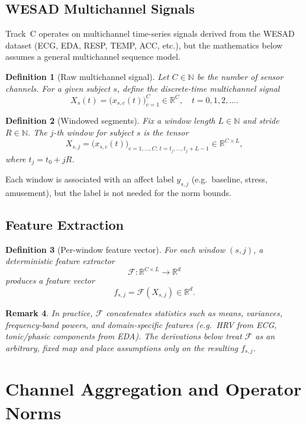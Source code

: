 \documentclass[11pt]{article}
\newtheorem{definition}{Definition}[section]
\newtheorem{remark}[definition]{Remark}
\newcommand{\R}{\mathbb{R}}
\newcommand{\N}{\mathbb{N}}
\begin{document}
\subsection{WESAD Multichannel Signals}

Track~C operates on multichannel time-series signals derived from the WESAD dataset (ECG, EDA, RESP, TEMP, ACC, etc.), but the mathematics below assumes a general multichannel sequence model.

\begin{definition}[Raw multichannel signal]
Let \(C \in \N\) be the number of sensor channels.
For a given subject \(s\), define the discrete-time multichannel signal
\[
  X_s(t) = \bigl(x_{s,c}(t)\bigr)_{c=1}^C \in \R^C, \quad t = 0,1,2,\dots .
\]
\end{definition}

\begin{definition}[Windowed segments]
Fix a window length \(L \in \N\) and stride \(R \in \N\).
The \(j\)-th window for subject \(s\) is the tensor
\[
  X_{s,j} = \bigl(x_{s,c}(t)\bigr)_{c=1,\dots,C;\, t = t_j,\dots,t_j+L-1}
  \in \R^{C \times L},
\]
where \(t_j = t_0 + jR\).
\end{definition}

Each window is associated with an affect label \(y_{s,j}\) (e.g.~baseline, stress, amusement), but the label is not needed for the norm bounds.

\subsection{Feature Extraction}

\begin{definition}[Per-window feature vector]
For each window \((s,j)\), a deterministic feature extractor
\[
  \mathcal{F} : \R^{C \times L} \to \R^d
\]
produces a feature vector
\[
  f_{s,j} = \mathcal{F}(X_{s,j}) \in \R^d.
\]
\end{definition}

\begin{remark}
In practice, \(\mathcal{F}\) concatenates statistics such as means, variances, frequency-band powers, and domain-specific features (e.g.~HRV from ECG, tonic/phasic components from EDA). The derivations below treat \(\mathcal{F}\) as an arbitrary, fixed map and place assumptions only on the resulting \(f_{s,j}\).
\end{remark}

\section{Channel Aggregation and Operator Norms}
\end{document}
